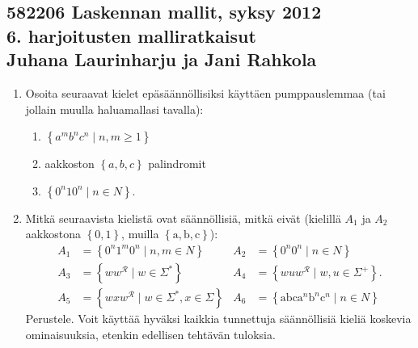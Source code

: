 \documentclass[a4paper,11pt]{article}
\newcommand{\set}[1]{{\left\{ #1 \right\}}}
\begin{document}
\subsection*{582206 Laskennan mallit, syksy 2012 \\
  \textmd{6. harjoitusten malliratkaisut \\
    Juhana Laurinharju ja Jani Rahkola}}

\begin{enumerate}

\subsubsection*{Säännölliset kielet}

\item
Osoita seuraavat kielet epäsäännöllisiksi käyttäen
pumppauslemmaa (tai jollain muulla haluamallasi tavalla):
\begin{enumerate}
\item
$\set{a^m b^n c^n\mid n,m\geq 1}$
\item
aakkoston $\set{a,b, c}$ palindromit
\item
$\set{0^n10^n\mid n\in N}$.
\end{enumerate}

\item
Mitkä seuraavista kielistä ovat säännöllisiä, mitkä
eivät (kielillä $A_1$ ja $A_2$ aakkostona $\set{0,1}$, muilla
$\set{\mathrm{a},\mathrm{b},\mathrm{c}}$):
\begin{align*}
A_1 &=\set{0^n1^m0^n\mid n,m\in N}
&A_2 &=\set{0^n0^n\mid n\in N}
\\
A_3 &=\set{ww^\mathcal{R}\mid w\in\Sigma^{\ast}}
&A_4 &=\set{wuw^\mathcal{R}\mid w,u\in\Sigma^+}.
\\
A_5 &=\set{wxw^\mathcal{R}\mid w\in\Sigma^{\ast},x\in\Sigma}
&A_6 &=\set{\mathrm{abc}\mathrm{a}^n\mathrm{b}^n\mathrm{c}^n\mid n\in N}
\end{align*}
Perustele.
Voit käyttää hyväksi kaikkia tunnettuja säännöllisiä
kieliä koskevia ominaisuuksia, etenkin edellisen tehtävän tuloksia.



%
%


\end{enumerate}
\end{document}
